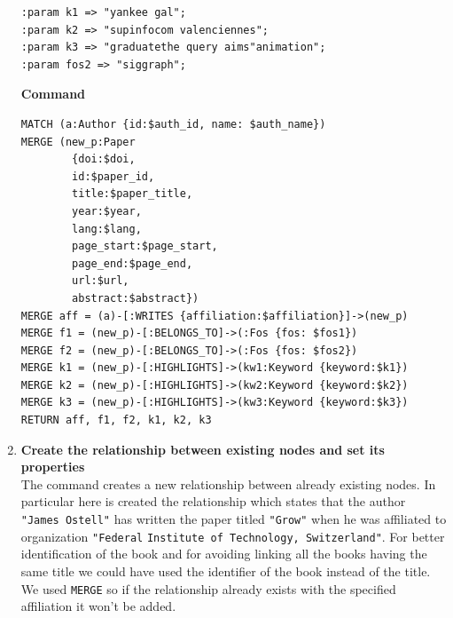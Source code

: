 \begin{enumerate}
\begin{lstlisting}[label={lst:parameters_command1neo4j}]
:param k1 => "yankee gal";
:param k2 => "supinfocom valenciennes";
:param k3 => "graduatethe query aims"animation";
:param fos2 => "siggraph";
    \end{lstlisting}
    \textbf{Command}
    \begin{lstlisting}[label={lst:command1neo4j}]
MATCH (a:Author {id:$auth_id, name: $auth_name})
MERGE (new_p:Paper
        {doi:$doi,
        id:$paper_id,
        title:$paper_title,
        year:$year,
        lang:$lang,
        page_start:$page_start,
        page_end:$page_end,
        url:$url,
        abstract:$abstract})
MERGE aff = (a)-[:WRITES {affiliation:$affiliation}]->(new_p)
MERGE f1 = (new_p)-[:BELONGS_TO]->(:Fos {fos: $fos1})
MERGE f2 = (new_p)-[:BELONGS_TO]->(:Fos {fos: $fos2})
MERGE k1 = (new_p)-[:HIGHLIGHTS]->(kw1:Keyword {keyword:$k1})
MERGE k2 = (new_p)-[:HIGHLIGHTS]->(kw2:Keyword {keyword:$k2})
MERGE k3 = (new_p)-[:HIGHLIGHTS]->(kw3:Keyword {keyword:$k3})
RETURN aff, f1, f2, k1, k2, k3
    \end{lstlisting}
    \item \textbf{Create the relationship between existing nodes and set its properties} \\
    The command creates a new relationship between already existing nodes.
    In particular here is created the relationship which states that the author \verb|"James Ostell"| has written the paper titled \verb|"Grow"| when he was affiliated to organization \verb|"Federal| \verb|Institute of Technology, Switzerland"|.
    For better identification of the book and for avoiding linking all the books having the same title we could have used the identifier of the book instead of the title.
    We used \verb|MERGE| so if the relationship already exists with the specified affiliation it won't be added.


\end{enumerate}
